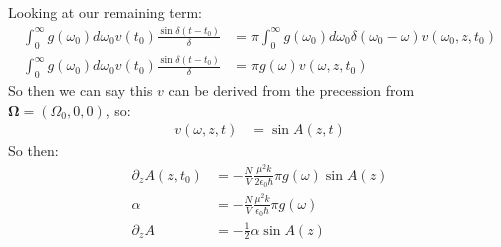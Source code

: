 Looking at our remaining term:
\begin{align*}
	\int_0^\infty g(\omega_0) d\omega_0 v(t_0) \frac{\sin \delta(t-t_0)}{\delta} &= \pi \int_0^\infty g(\omega_0) d\omega_0 \delta(\omega_0 - \omega) v(\omega_0,z,t_0) \\
	\int_0^\infty g(\omega_0) d\omega_0 v(t_0) \frac{\sin \delta(t-t_0)}{\delta} &= \pi g(\omega) v(\omega,z,t_0)
\end{align*}
So then we can say this $v$ can be derived from the precession from $\bm{\Omega} = (\Omega_0, 0, 0)$, so:
\begin{align*}
	v(\omega,z,t) &= \sin A(z,t)
\end{align*}
So then:
\begin{align*}
	\partial_zA(z,t_0) &= -\frac{N}{V}\frac{\mu^2 k}{2\epsilon_0\hbar} \pi g(\omega) \sin A(z) \\
	\alpha &= -\frac{N}{V} \frac{\mu^2k}{\epsilon_0\hbar} \pi g(\omega) \\
	\partial_z A &= -\frac{1}{2}\alpha \sin A(z)
\end{align*}
